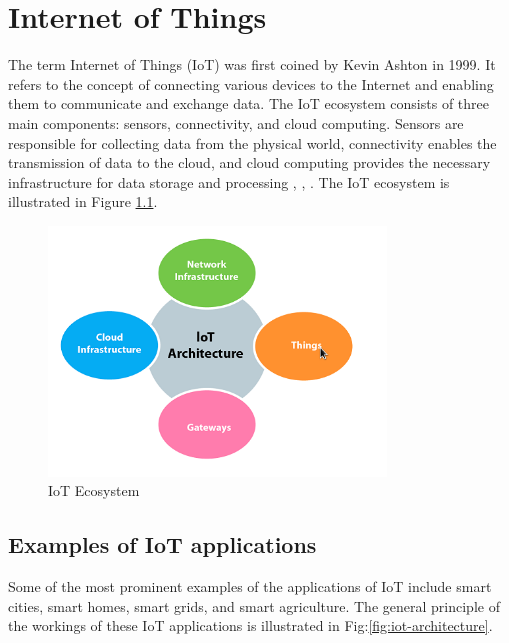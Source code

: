 \chapter{Internet of Things}

The term Internet of Things (IoT) was first coined by Kevin Ashton in 1999. It refers to the concept of connecting various devices to the Internet and enabling them to communicate and exchange data. The IoT ecosystem consists of three main components: sensors, connectivity, and cloud computing. Sensors are responsible for collecting data from the physical world, connectivity enables the transmission of data to the cloud, and cloud computing provides the necessary infrastructure for data storage and processing \cite{ibm-iot}, \cite{javapoint-iot}, \cite{Capra2019EdgeWorld}.
The IoT ecosystem is illustrated in Figure \ref{fig:iot-ecosys}.
\begin{figure}[h!]
    \centering
    \includegraphics[width=0.8\textwidth]{pict/iot-ecosys.png}
    \caption{IoT Ecosystem \cite{javapoint-iot}}
    \label{fig:iot-ecosys}
\end{figure}

\section*{Examples of IoT applications}
Some of the most prominent examples of the applications of IoT include smart cities, smart homes, smart grids, and smart agriculture. The general principle of the workings of these IoT applications is illustrated in Fig:\ref{fig:iot-architecture}.

